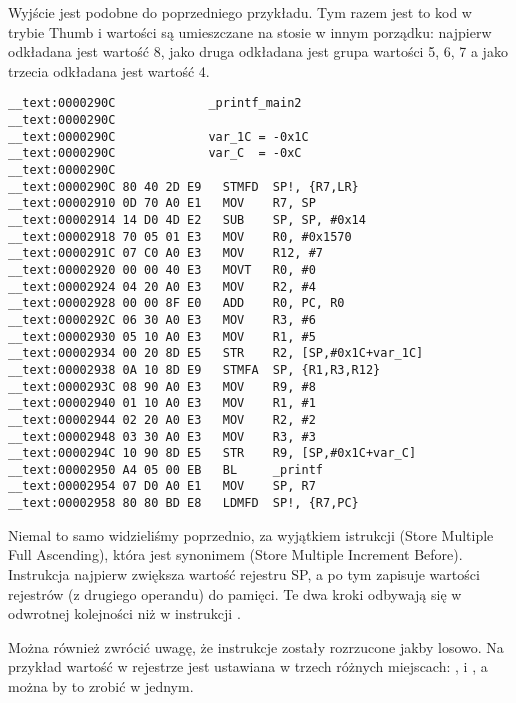 \myparagraph{\OptimizingKeilVI: \ThumbMode}



Wyjście jest podobne do poprzedniego przykładu. Tym razem jest to kod w trybie Thumb i wartości są umieszczane na stosie w innym porządku:
najpierw odkładana jest wartość 8, jako druga odkładana jest grupa wartości 5, 6, 7 a jako trzecia odkładana jest wartość 4.

\myparagraph{\OptimizingXcodeIV: \ARMMode}

\begin{lstlisting}[style=customasmARM]
__text:0000290C             _printf_main2
__text:0000290C
__text:0000290C             var_1C = -0x1C
__text:0000290C             var_C  = -0xC
__text:0000290C
__text:0000290C 80 40 2D E9   STMFD  SP!, {R7,LR}
__text:00002910 0D 70 A0 E1   MOV    R7, SP
__text:00002914 14 D0 4D E2   SUB    SP, SP, #0x14
__text:00002918 70 05 01 E3   MOV    R0, #0x1570
__text:0000291C 07 C0 A0 E3   MOV    R12, #7
__text:00002920 00 00 40 E3   MOVT   R0, #0
__text:00002924 04 20 A0 E3   MOV    R2, #4
__text:00002928 00 00 8F E0   ADD    R0, PC, R0
__text:0000292C 06 30 A0 E3   MOV    R3, #6
__text:00002930 05 10 A0 E3   MOV    R1, #5
__text:00002934 00 20 8D E5   STR    R2, [SP,#0x1C+var_1C]
__text:00002938 0A 10 8D E9   STMFA  SP, {R1,R3,R12}
__text:0000293C 08 90 A0 E3   MOV    R9, #8
__text:00002940 01 10 A0 E3   MOV    R1, #1
__text:00002944 02 20 A0 E3   MOV    R2, #2
__text:00002948 03 30 A0 E3   MOV    R3, #3
__text:0000294C 10 90 8D E5   STR    R9, [SP,#0x1C+var_C]
__text:00002950 A4 05 00 EB   BL     _printf
__text:00002954 07 D0 A0 E1   MOV    SP, R7
__text:00002958 80 80 BD E8   LDMFD  SP!, {R7,PC}
\end{lstlisting}

Niemal to samo widzieliśmy poprzednio, za wyjątkiem istrukcji  (Store Multiple Full Ascending), która jest synonimem  (Store Multiple Increment Before).
Instrukcja najpierw zwiększa wartość rejestru \ac{SP}, a po tym zapisuje wartości rejestrów (z drugiego operandu) do pamięci. Te dwa kroki odbywają się w odwrotnej kolejności niż w instrukcji .

Można również zwrócić uwagę, że instrukcje zostały rozrzucone jakby losowo. Na przykład wartość w rejestrze  jest ustawiana w trzech różnych miejscach: ,  i , a można by to zrobić w jednym.

